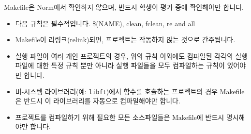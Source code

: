 \documentclass{42-ko}
\begin{document}
            Makefile은 Norm에서 확인하지 않으며, 반드시
              학생이 평가 중에 확인해야만 합니다.
            \begin{itemize}

                \item 다음 규칙은 필수적입니다.
                  \$(NAME), clean, fclean, re and all

                \item Makefile이 리링크(relink)되면, 프로젝트는
                  작동하지 않는 것으로 간주됩니다.

                \item 실행 파일이 여러 개인 프로젝트의 경우, 위의 규칙 이외에도
                  컴파일된 각각의 실행 파일에 대한 특정 규칙 뿐만 아니라
                  실행 파일들을 모두 컴파일하는 규칙이 있어야만 합니다.

                  \item 비-시스템 라이브러리(예: \texttt{libft})에서
                    함수를 호출하는 프로젝트의 경우 Makefile은
                    반드시 이 라이브러리를 자동으로 컴파일해야만 합니다.

                  \item 프로젝트를 컴파일하기 위해 필요한 모든 소스파일들은 
                    Makefile에 반드시 명시해야만 합니다.

            \end{itemize}
\end{document}

